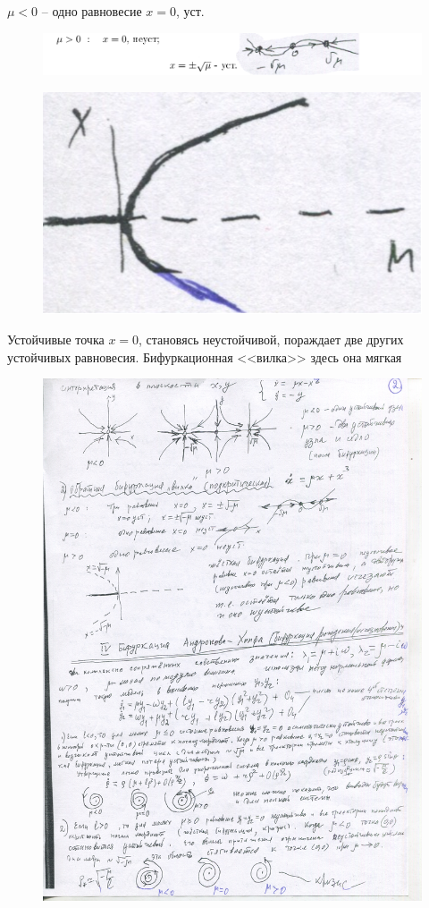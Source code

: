 \documentclass[a4paper,12pt]{article}
\theoremstyle{plain} %
\theoremstyle{definition} %
\theoremstyle{remark} %
\begin{document}
$\mu<0$ -- одно равновесие $x=0$, уст.
\begin{figure}[h!]
\includegraphics[scale=0.81]{55}
\end{figure}
\begin{figure}
\includegraphics[scale=0.38]{66}
\end{figure}
Устойчивые точка $x=0$, становясь неустойчивой, пораждает две других устойчивых равновесия. Бифуркационная <<вилка>> здесь она мягкая
\newpage
\begin{figure}[h!]
\includegraphics[scale=0.21]{77}
\end{figure}
\end{document}
